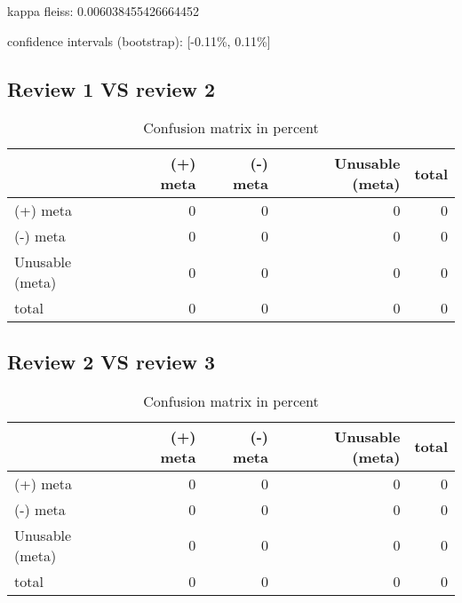 \documentclass{article}
\begin{document}
kappa fleiss: 0.006038455426664452

confidence intervals (bootstrap): [-0.11\%, 0.11\%]

\subsection{Review 1 VS review 2} 

\begin{table}[H]

\centering

\begin{tabular}{lrrrr}
\hline
                 &   (+) meta &   (-) meta &   Unusable (meta) &   total \\
\hline
 (+) meta        &          0 &          0 &                 0 &       0 \\
 (-) meta        &          0 &          0 &                 0 &       0 \\
 Unusable (meta) &          0 &          0 &                 0 &       0 \\
 total           &          0 &          0 &                 0 &       0 \\
\hline
\end{tabular}\caption{Confusion matrix in percent}

\end{table}



\subsection{Review 2 VS review 3} 

\begin{table}[H]

\centering

\begin{tabular}{lrrrr}
\hline
                 &   (+) meta &   (-) meta &   Unusable (meta) &   total \\
\hline
 (+) meta        &          0 &          0 &                 0 &       0 \\
 (-) meta        &          0 &          0 &                 0 &       0 \\
 Unusable (meta) &          0 &          0 &                 0 &       0 \\
 total           &          0 &          0 &                 0 &       0 \\
\hline
\end{tabular}\caption{Confusion matrix in percent}

\end{table}
\end{document}
